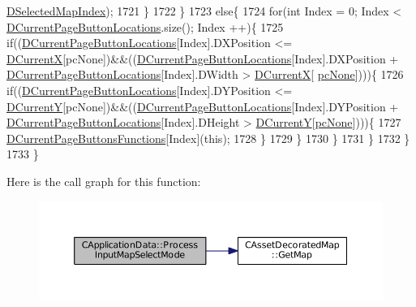 \begin{DoxyCode}
      \hyperlink{classCApplicationData_a279cfd90004e3f1b90b119358ff25586}{DSelectedMapIndex});
1721             \}
1722         \}
1723         \textcolor{keywordflow}{else}\{
1724             \textcolor{keywordflow}{for}(\textcolor{keywordtype}{int} Index = 0; Index < \hyperlink{classCApplicationData_a3615df8e23cea3ce17f11cf61340a7b4}{DCurrentPageButtonLocations}.size(); Index
      ++)\{
1725                 \textcolor{keywordflow}{if}((\hyperlink{classCApplicationData_a3615df8e23cea3ce17f11cf61340a7b4}{DCurrentPageButtonLocations}[Index].DXPosition <= 
      \hyperlink{classCApplicationData_a1dc7ee482a39f7978c71365ac540f97a}{DCurrentX}[pcNone])&&((\hyperlink{classCApplicationData_a3615df8e23cea3ce17f11cf61340a7b4}{DCurrentPageButtonLocations}[Index].DXPosition + 
      \hyperlink{classCApplicationData_a3615df8e23cea3ce17f11cf61340a7b4}{DCurrentPageButtonLocations}[Index].DWidth > \hyperlink{classCApplicationData_a1dc7ee482a39f7978c71365ac540f97a}{DCurrentX}[
      \hyperlink{GameDataTypes_8h_aafb0ca75933357ff28a6d7efbdd7602fa88767aa8e02c7b3192bbab4127b3d729}{pcNone}])))\{
1726                     \textcolor{keywordflow}{if}((\hyperlink{classCApplicationData_a3615df8e23cea3ce17f11cf61340a7b4}{DCurrentPageButtonLocations}[Index].DYPosition <= 
      \hyperlink{classCApplicationData_a0ba39779ae11c8072258c6ddfebd6052}{DCurrentY}[pcNone])&&((\hyperlink{classCApplicationData_a3615df8e23cea3ce17f11cf61340a7b4}{DCurrentPageButtonLocations}[Index].DYPosition + 
      \hyperlink{classCApplicationData_a3615df8e23cea3ce17f11cf61340a7b4}{DCurrentPageButtonLocations}[Index].DHeight > 
      \hyperlink{classCApplicationData_a0ba39779ae11c8072258c6ddfebd6052}{DCurrentY}[\hyperlink{GameDataTypes_8h_aafb0ca75933357ff28a6d7efbdd7602fa88767aa8e02c7b3192bbab4127b3d729}{pcNone}])))\{
1727                         \hyperlink{classCApplicationData_ad3079e5563a19d21c1e4ceff2a188382}{DCurrentPageButtonsFunctions}[Index](\textcolor{keyword}{this});
1728                     \}
1729                 \}
1730             \}
1731         \}
1732     \}
1733 \}
\end{DoxyCode}
Here is the call graph for this function\+:\nopagebreak
\begin{figure}[H]
\begin{center}
\leavevmode
\includegraphics[width=350pt]{classCApplicationData_a4fb3ad6900161476b5dace2d7cf9908c_cgraph}
\end{center}
\end{figure}

